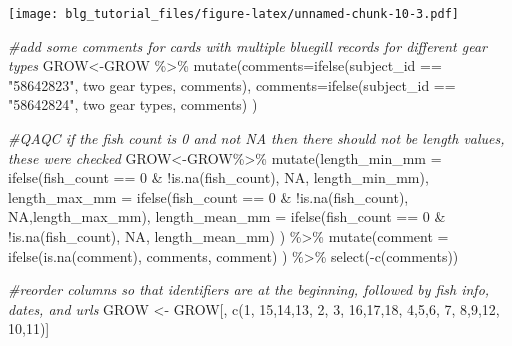 \documentclass[
]{article}
\newenvironment{Shaded}{\begin{snugshade}}{\end{snugshade}}
\newcommand{\AttributeTok}[1]{\textcolor[rgb]{0.77,0.63,0.00}{#1}}
\newcommand{\CommentTok}[1]{\textcolor[rgb]{0.56,0.35,0.01}{\textit{#1}}}
\newcommand{\ConstantTok}[1]{\textcolor[rgb]{0.00,0.00,0.00}{#1}}
\newcommand{\DecValTok}[1]{\textcolor[rgb]{0.00,0.00,0.81}{#1}}
\newcommand{\FunctionTok}[1]{\textcolor[rgb]{0.00,0.00,0.00}{#1}}
\newcommand{\NormalTok}[1]{#1}
\newcommand{\OtherTok}[1]{\textcolor[rgb]{0.56,0.35,0.01}{#1}}
\newcommand{\SpecialCharTok}[1]{\textcolor[rgb]{0.00,0.00,0.00}{#1}}
\newcommand{\StringTok}[1]{\textcolor[rgb]{0.31,0.60,0.02}{#1}}
\begin{document}
\texttt{[image: blg\_tutorial\_files/figure-latex/unnamed-chunk-10-3.pdf]}

\begin{Shaded}
\begin{Highlighting}[]
\CommentTok{\#add some comments for cards with multiple bluegill records for different gear types }
\NormalTok{GROW}\OtherTok{\textless{}{-}}\NormalTok{GROW }\SpecialCharTok{\%\textgreater{}\%} 
  \FunctionTok{mutate}\NormalTok{(}\AttributeTok{comments=}\FunctionTok{ifelse}\NormalTok{(subject\_id }\SpecialCharTok{==} \StringTok{"58642823"}\NormalTok{, }\StringTok{\textquotesingle{}two gear types\textquotesingle{}}\NormalTok{, comments), }
        \AttributeTok{comments=}\FunctionTok{ifelse}\NormalTok{(subject\_id }\SpecialCharTok{==} \StringTok{"58642824"}\NormalTok{, }\StringTok{\textquotesingle{}two gear types\textquotesingle{}}\NormalTok{, comments)}
\NormalTok{  )}

\CommentTok{\#QAQC if the fish count is 0 and not NA then there should not be length values, these were checked }
\NormalTok{GROW}\OtherTok{\textless{}{-}}\NormalTok{GROW}\SpecialCharTok{\%\textgreater{}\%} 
  \FunctionTok{mutate}\NormalTok{(}\AttributeTok{length\_min\_mm =} \FunctionTok{ifelse}\NormalTok{(fish\_count }\SpecialCharTok{==} \DecValTok{0} \SpecialCharTok{\&} \SpecialCharTok{!}\FunctionTok{is.na}\NormalTok{(fish\_count), }\ConstantTok{NA}\NormalTok{, length\_min\_mm),}
         \AttributeTok{length\_max\_mm =} \FunctionTok{ifelse}\NormalTok{(fish\_count }\SpecialCharTok{==} \DecValTok{0} \SpecialCharTok{\&} \SpecialCharTok{!}\FunctionTok{is.na}\NormalTok{(fish\_count), }\ConstantTok{NA}\NormalTok{,length\_max\_mm),}
         \AttributeTok{length\_mean\_mm =} \FunctionTok{ifelse}\NormalTok{(fish\_count }\SpecialCharTok{==} \DecValTok{0} \SpecialCharTok{\&} \SpecialCharTok{!}\FunctionTok{is.na}\NormalTok{(fish\_count), }\ConstantTok{NA}\NormalTok{, length\_mean\_mm)}
\NormalTok{) }\SpecialCharTok{\%\textgreater{}\%} 
  \FunctionTok{mutate}\NormalTok{(}\AttributeTok{comment =} \FunctionTok{ifelse}\NormalTok{(}\FunctionTok{is.na}\NormalTok{(comment), comments, comment)}
\NormalTok{         ) }\SpecialCharTok{\%\textgreater{}\%} 
  \FunctionTok{select}\NormalTok{(}\SpecialCharTok{{-}}\FunctionTok{c}\NormalTok{(comments))}

\CommentTok{\#reorder columns so that identifiers are at the beginning, followed by fish info, dates, and urls}
\NormalTok{GROW }\OtherTok{\textless{}{-}}\NormalTok{ GROW[, }\FunctionTok{c}\NormalTok{(}\DecValTok{1}\NormalTok{, }\DecValTok{15}\NormalTok{,}\DecValTok{14}\NormalTok{,}\DecValTok{13}\NormalTok{, }\DecValTok{2}\NormalTok{, }\DecValTok{3}\NormalTok{, }\DecValTok{16}\NormalTok{,}\DecValTok{17}\NormalTok{,}\DecValTok{18}\NormalTok{, }\DecValTok{4}\NormalTok{,}\DecValTok{5}\NormalTok{,}\DecValTok{6}\NormalTok{, }\DecValTok{7}\NormalTok{, }\DecValTok{8}\NormalTok{,}\DecValTok{9}\NormalTok{,}\DecValTok{12}\NormalTok{, }\DecValTok{10}\NormalTok{,}\DecValTok{11}\NormalTok{)]}
\end{Highlighting}
\end{Shaded}
\end{document}
